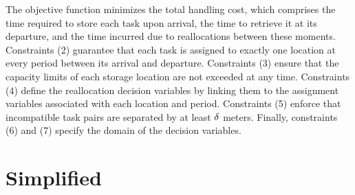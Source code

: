 \documentclass[a4paper,twoside,11pt]{article}
\begin{document}
The objective function minimizes the total handling cost, which comprises the time required to store each task upon arrival, the time to retrieve it at its departure, and the time incurred due to reallocations between these moments. Constraints (2) guarantee that each task is assigned to exactly one location at every period between its arrival and departure. Constraints (3) ensure that the capacity limits of each storage location are not exceeded at any time. Constraints (4) define the reallocation decision variables by linking them to the assignment variables associated with each location and period. Constraints (5) enforce that incompatible task pairs are separated by at least $\delta$ meters. Finally, constraints (6) and (7) specify the domain of the decision variables.


\section{Simplified}
\end{document}
